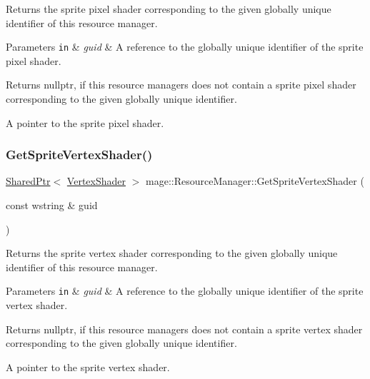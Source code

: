 Returns the sprite pixel shader corresponding to the given globally unique identifier of this resource manager.


\begin{DoxyParams}[1]{Parameters}
\mbox{\tt in}  & {\em guid} & A reference to the globally unique identifier of the sprite pixel shader. \\
\hline
\end{DoxyParams}
\begin{DoxyReturn}{Returns}
{\ttfamily nullptr}, if this resource managers does not contain a sprite pixel shader corresponding to the given globally unique identifier. 

A pointer to the sprite pixel shader. 
\end{DoxyReturn}
\hypertarget{classmage_1_1_resource_manager_a1ac90a5ce2cee1a06731bc8c57b86deb}{}\label{classmage_1_1_resource_manager_a1ac90a5ce2cee1a06731bc8c57b86deb} 
\subsubsection{\texorpdfstring{Get\+Sprite\+Vertex\+Shader()}{GetSpriteVertexShader()}}
{\footnotesize\ttfamily \hyperlink{namespacemage_a1e01ae66713838a7a67d30e44c67703e}{Shared\+Ptr}$<$ \hyperlink{classmage_1_1_vertex_shader}{Vertex\+Shader} $>$ mage\+::\+Resource\+Manager\+::\+Get\+Sprite\+Vertex\+Shader (\begin{DoxyParamCaption}\item[{const wstring \&}]{guid }\end{DoxyParamCaption})\hspace{0.3cm}{\ttfamily [noexcept]}}

Returns the sprite vertex shader corresponding to the given globally unique identifier of this resource manager.


\begin{DoxyParams}[1]{Parameters}
\mbox{\tt in}  & {\em guid} & A reference to the globally unique identifier of the sprite vertex shader. \\
\hline
\end{DoxyParams}
\begin{DoxyReturn}{Returns}
{\ttfamily nullptr}, if this resource managers does not contain a sprite vertex shader corresponding to the given globally unique identifier. 

A pointer to the sprite vertex shader. 
\end{DoxyReturn}
\hypertarget{classmage_1_1_resource_manager_a2aaa87096cb50a43fdacb5cdb7d729a8}{}\label{classmage_1_1_resource_manager_a2aaa87096cb50a43fdacb5cdb7d729a8} 
